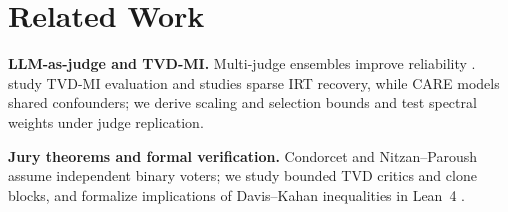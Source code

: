 \section{Related Work}
\label{sec:related}

\textbf{LLM-as-judge and TVD-MI.} Multi-judge ensembles improve reliability \citep{zheng2023judging, dubois2023alpacafarm, verga2024replacing, malik2025rewardbench2}. \citet{robertson2026information} study TVD-MI evaluation and \citet{robertson2025identity} studies sparse IRT recovery, while CARE \citep{zhao2026care} models shared confounders; we derive scaling and selection bounds and test spectral weights under judge replication.

\textbf{Jury theorems and formal verification.} Condorcet and Nitzan--Paroush \citep{condorcet1785, nitzan1982optimal} assume independent binary voters; we study bounded TVD critics and clone blocks, and formalize implications of Davis--Kahan inequalities \citep{davis1970rotation} in Lean~4 \citep{mathlib2020}.
